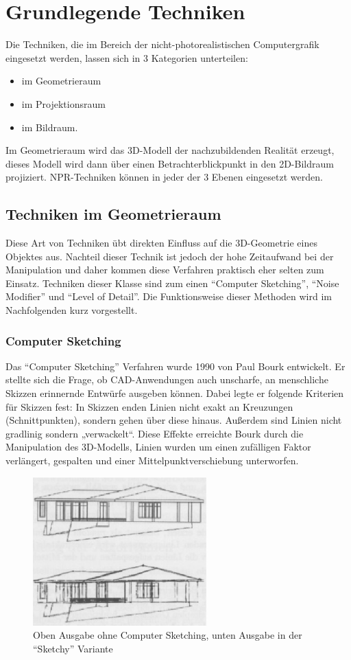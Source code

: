 \section{Grundlegende Techniken}
Die Techniken, die im Bereich der nicht-photorealistischen Computergrafik 
eingesetzt werden, lassen sich in 3 Kategorien unterteilen:
\begin{itemize}
  \item im Geometrieraum
  \item im Projektionsraum
  \item im Bildraum.
\end{itemize}
  Im Geometrieraum wird das 3D-Modell der nachzubildenden Realität erzeugt, 
  dieses Modell wird dann über einen Betrachterblickpunkt in den 2D-Bildraum 
  projiziert. NPR-Techniken können in jeder der 3 Ebenen eingesetzt werden.

\subsection{Techniken im Geometrieraum}
Diese Art von Techniken übt direkten Einfluss auf die 3D-Geometrie eines Objektes 
aus. Nachteil dieser Technik ist jedoch der hohe Zeitaufwand bei der 
Manipulation und daher kommen diese Verfahren praktisch eher selten zum 
Einsatz. Techniken dieser Klasse sind zum einen "`Computer Sketching"', "`Noise 
Modifier"' und "`Level of Detail"'. Die Funktionsweise dieser Methoden wird im 
Nachfolgenden kurz vorgestellt.

\subsubsection{Computer Sketching}
Das "`Computer Sketching"' Verfahren wurde 1990 von Paul Bourk entwickelt. Er 
stellte sich die Frage, ob CAD-Anwendungen auch unscharfe, an menschliche 
Skizzen erinnernde Entwürfe ausgeben können. Dabei legte er folgende Kriterien 
für Skizzen fest: In Skizzen enden Linien nicht exakt an Kreuzungen 
(Schnittpunkten), sondern gehen über diese hinaus. Außerdem sind Linien nicht 
gradlinig sondern „verwackelt“. Diese Effekte erreichte Bourk durch die 
Manipulation des 3D-Modells, Linien wurden um einen zufälligen Faktor 
verlängert, gespalten und einer Mittelpunktverschiebung unterworfen.
\begin{figure}
  \centering
  \includegraphics[width=0.60\textwidth]{../images/ComputerSketching}
  \caption{Oben Ausgabe ohne Computer Sketching, unten Ausgabe in der
  "`Sketchy"' Variante}
  \label{fig:ComputerSketching}
\end{figure}


